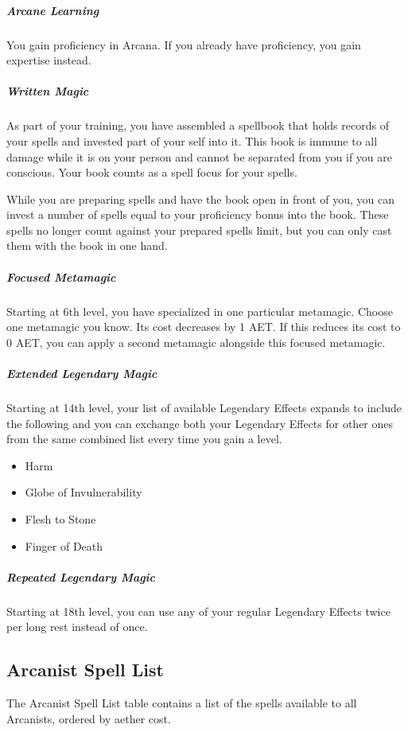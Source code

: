 \subparagraph*{Arcane Learning}
You gain proficiency in Arcana. If you already have proficiency, you gain expertise instead.

\subparagraph*{Written Magic}
As part of your training, you have assembled a spellbook that holds records of your spells and invested part of your self into it. This book is immune to all damage while it is on your person and cannot be separated from you if you are conscious. Your book counts as a spell focus for your spells.

While you are preparing spells and have the book open in front of you, you can invest a number of spells equal to your proficiency bonus into the book. These spells no longer count against your prepared spells limit, but you can only cast them with the book in one hand.

\subparagraph*{Focused Metamagic}
Starting at 6th level, you have specialized in one particular metamagic. Choose one metamagic you know. Its cost decreases by 1 AET. If this reduces its cost to 0 AET, you can apply a second metamagic alongside this focused metamagic.

\subparagraph*{Extended Legendary Magic}
Starting at 14th level, your list of available Legendary Effects expands to include the following and you can exchange both your Legendary Effects for other ones from the same combined list every time you gain a level.

\begin{itemize}
  \item Harm
  \item Globe of Invulnerability
  \item Flesh to Stone
  \item Finger of Death
\end{itemize}

\subparagraph*{Repeated Legendary Magic}
Starting at 18th level, you can use any of your regular Legendary Effects twice per long rest instead of once.

\subsection{Arcanist Spell List}
The Arcanist Spell List table contains a list of the spells available to all Arcanists, ordered by aether cost.

